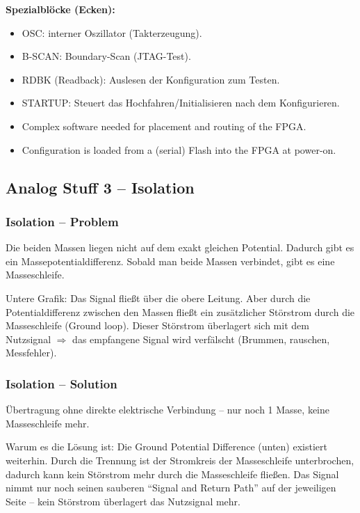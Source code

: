 \documentclass[11pt,a4paper]{article}
\begin{document}
\textbf{Spezialblöcke (Ecken):}
\begin{itemize}
    \item OSC: interner Oszillator (Takterzeugung).
    \item B-SCAN: Boundary-Scan (JTAG-Test).
    \item RDBK (Readback): Auslesen der Konfiguration zum Testen.
    \item STARTUP: Steuert das Hochfahren/Initialisieren nach dem Konfigurieren.
\end{itemize}
\begin{itemize}
    \item Complex software needed for placement and routing of the FPGA.
    \item Configuration is loaded from a (serial) Flash into the FPGA at power-on.
\end{itemize}

\subsection{Analog Stuff 3 -- Isolation}

\subsubsection{Isolation -- Problem}
Die beiden Massen liegen nicht auf dem exakt gleichen Potential. Dadurch gibt es ein Massepotentialdifferenz. Sobald man beide Massen verbindet, gibt es eine Masseschleife.

Untere Grafik: Das Signal fließt über die obere Leitung. Aber durch die Potentialdifferenz zwischen den Massen fließt ein zusätzlicher Störstrom durch die Masseschleife (Ground loop). Dieser Störstrom überlagert sich mit dem Nutzsignal $\Rightarrow$ das empfangene Signal wird verfälscht (Brummen, rauschen, Messfehler).

\subsubsection{Isolation -- Solution}
Übertragung ohne direkte elektrische Verbindung -- nur noch 1 Masse, keine Masseschleife mehr.

Warum es die Lösung ist: Die Ground Potential Difference (unten) existiert weiterhin. Durch die Trennung ist der Stromkreis der Masseschleife unterbrochen, dadurch kann kein Störstrom mehr durch die Masseschleife fließen. Das Signal nimmt nur noch seinen sauberen ``Signal and Return Path'' auf der jeweiligen Seite -- kein Störstrom überlagert das Nutzsignal mehr.
\end{document}
